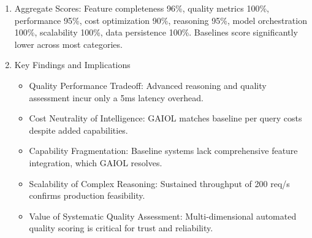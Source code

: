 \documentclass[final,5p,times,twocolumn,authoryear,draft]{elsarticle}
\begin{document}
\begin{enumerate}




\item{Aggregate Scores:}
Feature completeness 96\%, quality metrics 100\%, performance 95\%, cost optimization 90\%, reasoning 95\%, model orchestration 100\%, scalability 100\%, data persistence 100\%. Baselines score significantly lower across most categories.

\item{Key Findings and Implications}
\begin{itemize}
   
    \item Quality Performance Tradeoff: Advanced reasoning and quality assessment incur only a 5ms latency overhead.
    \item Cost Neutrality of Intelligence: GAIOL matches baseline per query costs despite added capabilities.
    \item Capability Fragmentation: Baseline systems lack comprehensive feature integration, which GAIOL resolves.
    \item Scalability of Complex Reasoning: Sustained throughput of 200 req/s confirms production feasibility.
    \item Value of Systematic Quality Assessment: Multi-dimensional automated quality scoring is critical for trust and reliability.
\end{itemize}

\end{enumerate}
\end{document}
